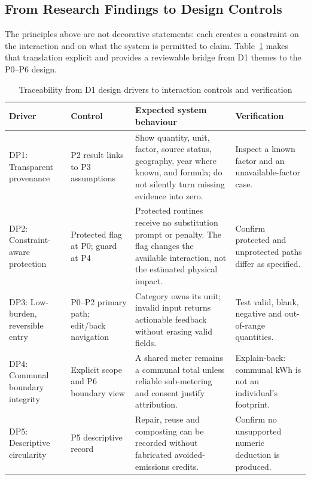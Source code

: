 \documentclass[12pt,a4paper]{article}
\begin{document}
\subsection{From Research Findings to Design Controls}
The principles above are not decorative statements: each creates a constraint on the interaction and on what the system is permitted to claim. Table~\ref{tab:design-controls} makes that translation explicit and provides a reviewable bridge from D1 themes to the P0--P6 design.

\begin{table}[ht]
\centering
\small
\caption{Traceability from D1 design drivers to interaction controls and verification}
\label{tab:design-controls}
\footnotesize
\setlength{\emergencystretch}{1em}
\begin{tabularx}{\textwidth}{@{}>{\raggedright\arraybackslash}p{2.7cm}>{\raggedright\arraybackslash}p{2.7cm}>{\raggedright\arraybackslash}X>{\raggedright\arraybackslash}p{2.7cm}@{}}
\toprule
\textbf{Driver} & \textbf{Control} & \textbf{Expected system behaviour} & \textbf{Verification}\\
\midrule
DP1: Transparent provenance & P2 result links to P3 assumptions & Show quantity, unit, factor, source status, geography, year where known, and formula; do not silently turn missing evidence into zero. & Inspect a known factor and an unavailable-factor case.\\
\rowcolor{brandlight}
DP2: Constraint-aware protection & Protected flag at P0; guard at P4 & Protected routines receive no substitution prompt or penalty. The flag changes the available interaction, not the estimated physical impact. & Confirm protected and unprotected paths differ as specified.\\
DP3: Low-burden, reversible entry & P0--P2 primary path; edit/back navigation & Category owns its unit; invalid input returns actionable feedback without erasing valid fields. & Test valid, blank, negative and out-of-range quantities.\\
\rowcolor{brandlight}
DP4: Communal boundary integrity & Explicit scope and P6 boundary view & A shared meter remains a communal total unless reliable sub-metering and consent justify attribution. & Explain-back: communal kWh is not an individual's footprint.\\
DP5: Descriptive circularity & P5 descriptive record & Repair, reuse and composting can be recorded without fabricated avoided-emissions credits. & Confirm no unsupported numeric deduction is produced.\\
\bottomrule
\end{tabularx}
\end{table}
\end{document}
